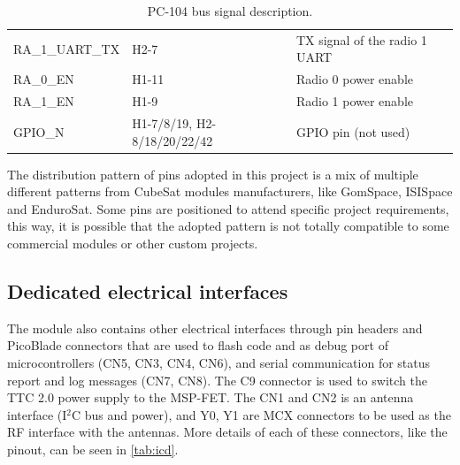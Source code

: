 \begin{table}[!h]
\begin{tabular}{lL{0.3\textwidth}l}
        RA\_1\_UART\_TX  & H2-7                             & TX signal of the radio 1 UART         \\
        RA\_0\_EN        & H1-11                            & Radio 0 power enable                  \\
        RA\_1\_EN        & H1-9                             & Radio 1 power enable                  \\
        GPIO\_N          & H1-7/8/19, H2-8/18/20/22/42      & GPIO pin (not used)                   \\
        \bottomrule[1.5pt]
    \end{tabular}
    \caption{PC-104 bus signal description.}
    \label{tab:pc104-signals}
\end{table}

The distribution pattern of pins adopted in this project is a mix of multiple different patterns from CubeSat modules manufacturers, like GomSpace, ISISpace and EnduroSat. Some pins are positioned to attend specific project requirements, this way, it is possible that the adopted pattern is not totally compatible to some commercial modules or other custom projects.

\subsection{Dedicated electrical interfaces}

The module also contains other electrical interfaces through pin headers and PicoBlade connectors that are used to flash code and as debug port of microcontrollers (CN5, CN3, CN4, CN6), and serial communication for status report and log messages (CN7, CN8). The C9 connector is used to switch the TTC 2.0 power supply to the MSP-FET. The CN1 and CN2 is an antenna interface (I$^{2}$C bus and power), and Y0, Y1 are MCX connectors to be used as the RF interface with the antennas. More details of each of these connectors, like the pinout, can be seen in \autoref{tab:icd}.

